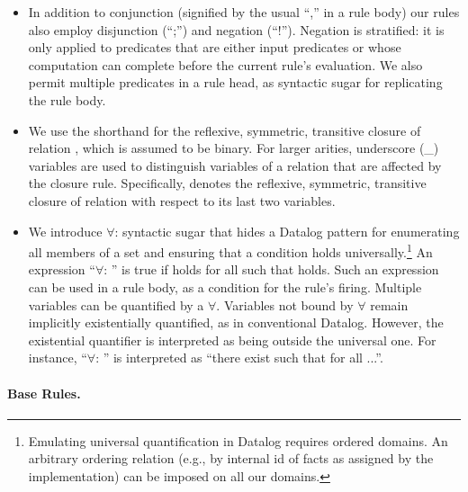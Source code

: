 \begin{itemize}
\item In addition to conjunction (signified by the usual ``,'' in a rule body)
	our rules also employ disjunction (``;'') and negation (``!''). Negation is
	stratified: it is only applied to predicates that are either input
	predicates or whose computation can complete before the current rule's
	evaluation. We also permit multiple predicates in a rule head, as syntactic
	sugar for replicating the rule body.%

\item We use the shorthand  for the reflexive, symmetric,
	transitive closure of relation , which is assumed to be binary.
	For larger arities, underscore (\_) variables are used to distinguish
	variables of a relation that are affected by the closure rule.
	Specifically,  denotes the reflexive,
	symmetric, transitive closure of relation  with respect
	to its last two variables.

\item We introduce $\forall$: syntactic sugar that hides a Datalog pattern for
	enumerating all members of a set and ensuring that a condition holds
	universally.\footnote{Emulating universal quantification in Datalog
	  requires ordered domains. 
    An arbitrary ordering relation (e.g., by internal id of facts as assigned by
	the implementation) can be imposed on all our domains.} An expression
	``$\forall$:   ''  is
	true if  holds for all  such that  holds.
	Such an expression can be used in a rule body, as a condition for the
	rule's firing. Multiple variables can be quantified by a $\forall$. Variables
	not bound by $\forall$ remain implicitly existentially
	quantified, as in conventional Datalog. However, the existential quantifier
	is interpreted as being outside the universal one. For instance,
	``$\forall$:  
	'' is interpreted as ``there exist  such that
	for all  ...''.
\end{itemize}



\paragraph{Base Rules.}

